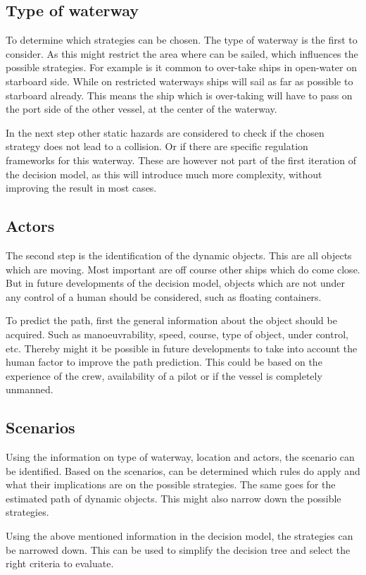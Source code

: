 \subsection{Type of waterway}
To determine which strategies can be chosen. The type of waterway is the first to consider. As this might restrict the area where can be sailed, which influences the possible strategies. For example is it common to over-take ships in open-water on starboard side. While on restricted waterways ships will sail as far as possible to starboard already. This means the ship which is over-taking will have to pass on the port side of the other vessel, at the center of the waterway.

In the next step other static hazards are considered to check if the chosen strategy does not lead to a collision. Or if there are specific regulation frameworks for this waterway. These are however not part of the first iteration of the decision model, as this will introduce much more complexity, without improving the result in most cases.


\subsection{Actors}
The second step is the identification of the dynamic objects. This are all objects which are moving. Most important are off course other ships which do come close. But in future developments of the decision model, objects which are not under any control of a human should be considered, such as floating containers.

To predict the path, first the general information about the object should be acquired. Such as manoeuvrability, speed, course, type of object, under control, etc.
Thereby might it be possible in future developments to take into account the human factor to improve the path prediction. This could be based on the experience of the crew, availability of a pilot or if the vessel is completely unmanned.

\subsection{Scenarios}
Using the information on type of waterway, location and actors, the scenario can be identified. Based on the scenarios, can be determined which rules do apply and what their implications are on the possible strategies. 
The same goes for the estimated path of dynamic objects. This might also narrow down the possible strategies.

Using the above mentioned information in the decision model, the strategies can be narrowed down. This can be used to simplify the decision tree and select the right criteria to evaluate.

